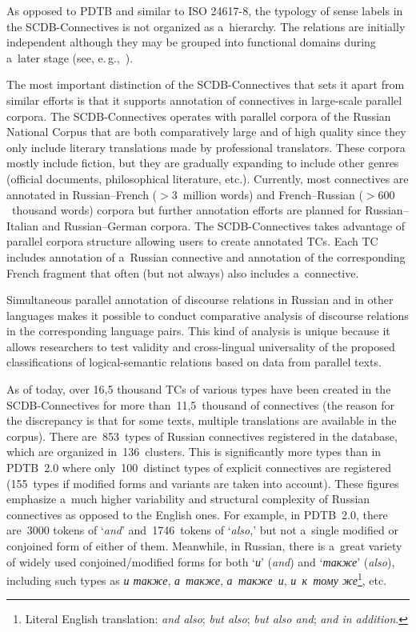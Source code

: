 \begin{multicols}{2}
  As opposed to PDTB and similar to ISO 24617-8, the typology of sense labels in 
the SCDB-Connectives is not organized as a~hierarchy. The relations are initially 
independent although they may be grouped into functional domains during a~later 
stage (see, e.\,g.,~\cite{14-kr}).
{

}
  
  The most important distinction of the SCDB-Connectives that sets it apart from 
similar efforts is that it supports annotation of connectives in large-scale parallel 
corpora. The SCDB-Connectives operates with parallel corpora of the  
Russian National Corpus that are both comparatively large and of high quality since they only 
include literary translations made by professional translators. These corpora mostly 
include fiction, but they are gradually expanding to include other genres (official 
documents, philosophical literature, etc.). Currently, most connectives are annotated in 
Russian--French ($> 3$~million words) and French--Russian ($> 600$~thousand 
words) corpora but further annotation efforts are planned for Russian--Italian and 
Russian--German corpora. The SCDB-Connectives takes advantage of parallel corpora 
structure allowing users to create annotated TCs. Each 
TC includes annotation of a~Russian connective and annotation of the corresponding 
French fragment that often (but not always)  also includes a~connective. 
  
  Simultaneous parallel annotation of discourse relations in Russian and in other 
languages makes it possible to conduct comparative analysis of discourse relations in 
the corresponding language pairs. This kind of analysis is unique because it allows 
researchers to test validity and cross-lingual universality of the proposed 
classifications of logical-semantic relations based on data from parallel texts.
  
  As of today, over 16,5 thousand TCs of various types have been created in the 
SCDB-Connectives for more than~11,5~thousand of connectives (the reason for the 
discrepancy is that for some texts, multiple translations are available in the corpus). 
There are~853~types of Russian connectives registered in the database, which are 
organized in~136~clusters. This is significantly more types than in PDTB~2.0 where 
only~100~distinct types of explicit connectives are registered (155~types if modified 
forms and variants are taken into account). These figures emphasize a~much higher 
variability and structural complexity of Russian connectives as opposed to the English 
ones. For example, in PDTB~2.0, there are~3000 tokens of `\textit{and}' 
and~1746~tokens of `\textit{also},' but not a~single modified or conjoined form of 
either of them. Meanwhile, in Russian, there is a~great variety of widely used 
conjoined/modified forms for both `\textit{и}' (\textit{and}) and `\textit{также}' 
(\textit{also}), including such types as \textit{и также}, \textit{а~также}, 
\textit{а~также~и}, \textit{и~к~тому же}\footnote{Literal English translation: \textit{and 
also}; \textit{but also}; \textit{but also and}; 
\textit{and in addition}.}, etc.
  

\end{multicols}
